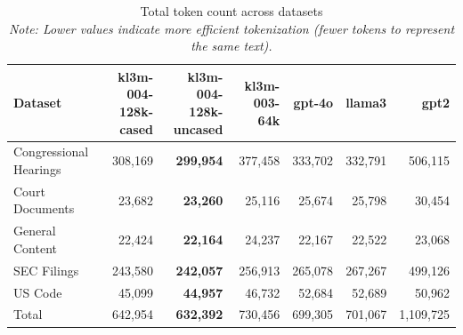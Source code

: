 \begin{table}[ht]
\centering
\caption{Total token count across datasets\\\small \textit{Note: Lower values indicate more efficient tokenization (fewer tokens to represent the same text).}}
\label{tab:token-count}
\small
\begin{tabular}{lrrrrrr}
\toprule
Dataset & kl3m\mbox{-}004\mbox{-}128k\mbox{-}cased & kl3m\mbox{-}004\mbox{-}128k\mbox{-}uncased & kl3m\mbox{-}003\mbox{-}64k & gpt\mbox{-}4o & llama3 & gpt2 \\
\midrule
Congressional Hearings & 308,169 & \textbf{299,954} & 377,458 & 333,702 & 332,791 & 506,115 \\
Court Documents & 23,682 & \textbf{23,260} & 25,116 & 25,674 & 25,798 & 30,454 \\
General Content & 22,424 & \textbf{22,164} & 24,237 & 22,167 & 22,522 & 23,068 \\
SEC Filings & 243,580 & \textbf{242,057} & 256,913 & 265,078 & 267,267 & 499,126 \\
US Code & 45,099 & \textbf{44,957} & 46,732 & 52,684 & 52,689 & 50,962 \\
\midrule
Total & 642,954 & \textbf{632,392} & 730,456 & 699,305 & 701,067 & 1,109,725 \\
\bottomrule
\end{tabular}
\end{table}

